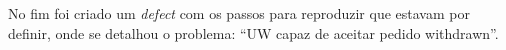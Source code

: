             No fim foi criado um \textit{defect} com os passos para reproduzir que estavam por definir, onde se detalhou o problema: ``UW capaz de aceitar pedido withdrawn''.


